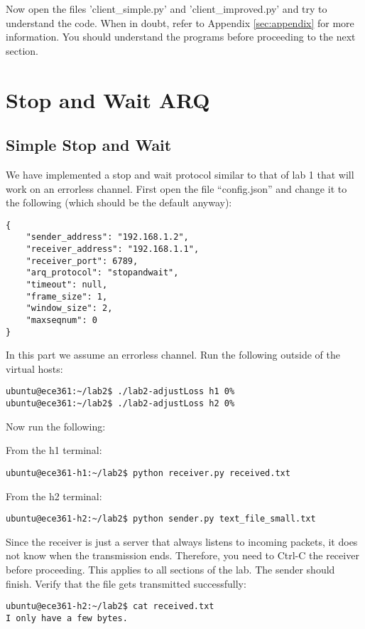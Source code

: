 \documentclass[11pt]{article}
\begin{document}
Now open the files 'client\_simple.py' and 'client\_improved.py' and try to understand the code. When in doubt, refer to Appendix \ref{sec:appendix} for more information. You should understand the programs before proceeding to the next section.

\section{Stop and Wait ARQ}
\label{sec:example}

\subsection{Simple Stop and Wait}
We have implemented a stop and wait protocol similar to that of lab 1 that will work on an errorless channel. First open the file ``config.json'' and change it to the following (which should be the default anyway):

\begin{minipage}{\linewidth}
\begin{lstlisting}[caption={Configuration For Small File}]
{
    "sender_address": "192.168.1.2",
    "receiver_address": "192.168.1.1",
    "receiver_port": 6789,
    "arq_protocol": "stopandwait",
    "timeout": null,
    "frame_size": 1,
    "window_size": 2,
    "maxseqnum": 0
}
\end{lstlisting}
\end{minipage}

In this part we assume an errorless channel. Run the following outside of the virtual hosts:
\begin{lstlisting}[style=ece361shell]
ubuntu@ece361:~/lab2$ ./lab2-adjustLoss h1 0%
ubuntu@ece361:~/lab2$ ./lab2-adjustLoss h2 0%
\end{lstlisting}


Now run the following:

From the h1 terminal:
\begin{lstlisting}[style=ece361shell, caption={}]
ubuntu@ece361-h1:~/lab2$ python receiver.py received.txt
\end{lstlisting}
From the h2 terminal:
\begin{lstlisting}[style=ece361shell, caption={}]
ubuntu@ece361-h2:~/lab2$ python sender.py text_file_small.txt
\end{lstlisting}
Since the receiver is just a server that always listens to incoming packets, it does not know when the transmission ends. Therefore, you need to Ctrl-C the receiver before proceeding. This applies to all sections of the lab.
The sender should finish. Verify that the file gets transmitted successfully:
\begin{lstlisting}[style=ece361shell]
ubuntu@ece361-h2:~/lab2$ cat received.txt
I only have a few bytes.
\end{lstlisting}
\end{document}
